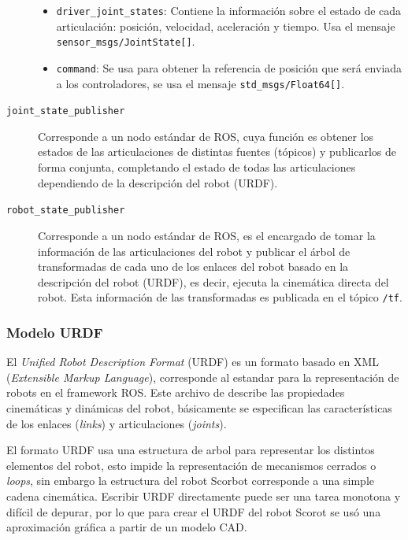 \begin{description}
\begin{itemize}
\item \texttt{driver\_joint\_states}: Contiene la información sobre el estado de cada articulación: posición, velocidad, aceleración y tiempo. Usa el mensaje  \texttt{sensor\_msgs/JointState[]}.

\item  \texttt{command}: Se usa para obtener la referencia de posición que será enviada a los controladores, se usa el mensaje \texttt{std\_msgs/Float64[]}.
 
\end{itemize}



\item[\texttt{joint\_state\_publisher}] Corresponde a un nodo estándar de ROS, cuya función es obtener los estados de las articulaciones de distintas fuentes (tópicos) y publicarlos de forma conjunta, completando el estado de todas las articulaciones dependiendo de la descripción del robot (URDF).

\item[\texttt{robot\_state\_publisher}] Corresponde a un nodo estándar de ROS, es el encargado de tomar la información de las articulaciones del robot y publicar el árbol de transformadas de cada uno de los enlaces del robot basado en la descripción del robot (URDF), es decir, ejecuta la cinemática directa del robot. Esta información de las transformadas es publicada en el tópico \texttt{/tf}.

\end{description}


\subsubsection{Modelo URDF}

El \textit{Unified Robot Description Format} (URDF) es un formato basado en XML (\textit{Extensible Markup Language}), corresponde al estandar para la representación de robots en el framework ROS. Este archivo de describe las propiedades cinemáticas y dinámicas del robot, básicamente se especifican las características de los enlaces (\textit{links}) y articulaciones (\textit{joints}).

El formato URDF usa una estructura de arbol para representar los distintos elementos del robot, esto impide la representación de mecanismos cerrados o \textit{loops}, sin embargo la estructura del robot Scorbot corresponde a una simple cadena cinemática. Escribir URDF directamente puede ser una tarea monotona y difícil de depurar, por lo que para crear el URDF del robot Scorot se usó una aproximación gráfica a partir de un modelo CAD.

